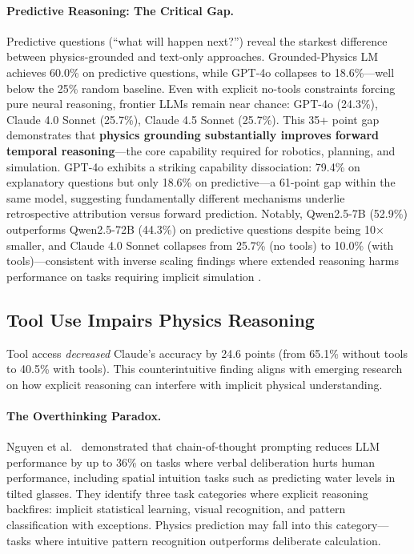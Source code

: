 \documentclass[conference]{IEEEtran}
\theoremstyle{plain}
\theoremstyle{definition}
\theoremstyle{remark}
\begin{document}
\paragraph{Predictive Reasoning: The Critical Gap.} Predictive questions (``what will happen next?'') reveal the starkest difference between physics-grounded and text-only approaches. Grounded-Physics LM achieves 60.0\% on predictive questions, while GPT-4o collapses to 18.6\%---well below the 25\% random baseline. Even with explicit no-tools constraints forcing pure neural reasoning, frontier LLMs remain near chance: GPT-4o (24.3\%), Claude 4.0 Sonnet (25.7\%), Claude 4.5 Sonnet (25.7\%). This 35+ point gap demonstrates that \textbf{physics grounding substantially improves forward temporal reasoning}---the core capability required for robotics, planning, and simulation. GPT-4o exhibits a striking capability dissociation: 79.4\% on explanatory questions but only 18.6\% on predictive---a 61-point gap within the same model, suggesting fundamentally different mechanisms underlie retrospective attribution versus forward prediction. Notably, Qwen2.5-7B (52.9\%) outperforms Qwen2.5-72B (44.3\%) on predictive questions despite being 10$\times$ smaller, and Claude 4.0 Sonnet collapses from 25.7\% (no tools) to 10.0\% (with tools)---consistent with inverse scaling findings where extended reasoning harms performance on tasks requiring implicit simulation \cite{mckenzie2023inverse}.

\subsection{Tool Use Impairs Physics Reasoning}

Tool access \emph{decreased} Claude's accuracy by 24.6 points (from 65.1\% without tools to 40.5\% with tools). This counterintuitive finding aligns with emerging research on how explicit reasoning can interfere with implicit physical understanding.

\paragraph{The Overthinking Paradox.} Nguyen et al.\ \cite{nguyen2025mindyourstep} demonstrated that chain-of-thought prompting reduces LLM performance by up to 36\% on tasks where verbal deliberation hurts human performance, including spatial intuition tasks such as predicting water levels in tilted glasses. They identify three task categories where explicit reasoning backfires: implicit statistical learning, visual recognition, and pattern classification with exceptions. Physics prediction may fall into this category---tasks where intuitive pattern recognition outperforms deliberate calculation.
\end{document}
